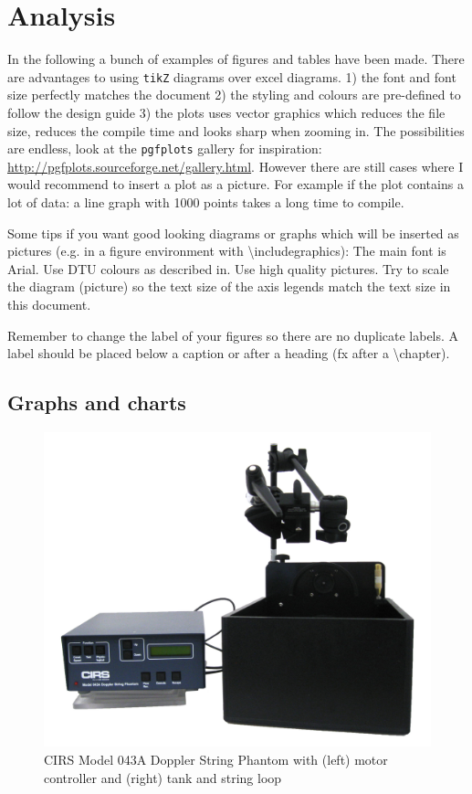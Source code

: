 \chapter{Analysis}
In the following a bunch of examples of figures and tables have been made. There are advantages to using \texttt{tikZ} diagrams over excel diagrams. 1) the font and font size perfectly matches the document 2) the styling and colours are pre-defined to follow the design guide 3) the plots uses vector graphics which reduces the file size, reduces the compile time and looks sharp when zooming in. The possibilities are endless, look at the \texttt{pgfplots} gallery for inspiration: \url{http://pgfplots.sourceforge.net/gallery.html}.
However there are still cases where I would recommend to insert a plot as a picture. For example if the plot contains a lot of data: a line graph with 1000 points takes a long time to compile.

Some tips if you want good looking diagrams or graphs which will be inserted as pictures (e.g. in a figure environment with \textbackslash includegraphics): The main font is Arial. Use DTU colours as described in. Use high quality pictures. Try to scale the diagram (picture) so the text size of the axis legends match the text size in this document.

Remember to change the label of your figures so there are no duplicate labels. A label should be placed below a caption or after a heading (fx after a \textbackslash chapter).

\section{Graphs and charts}

\begin{figure}[htbp]
	\centering
	\includegraphics[width=.8\textwidth]{Figures/5_cirs_043a_image.jpg}
	\caption[CIRS Model 043A Doppler String Phantom]{CIRS Model 043A Doppler String Phantom with (left) motor controller and (right) tank and string loop}
\end{figure}

